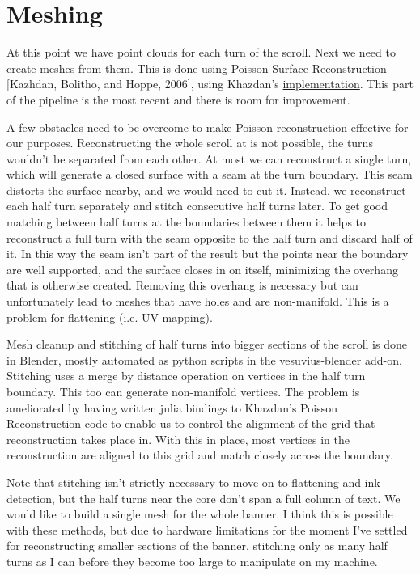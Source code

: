 \documentclass{article}
\begin{document}
\section{Meshing}

At this point we have point clouds for each turn of the scroll. Next we need to create meshes from them. This is done using Poisson Surface Reconstruction [Kazhdan, Bolitho, and Hoppe, 2006], using Khazdan's \href{https://github.com/mkazhdan/PoissonRecon}{implementation}. This part of the pipeline is the most recent and there is room for improvement.

A few obstacles need to be overcome to make Poisson reconstruction effective for our purposes. Reconstructing the whole scroll at is not possible, the turns wouldn't be separated from each other. At most we can reconstruct a single turn, which will generate a closed surface with a seam at the turn boundary. This seam distorts the surface nearby, and we would need to cut it. Instead, we reconstruct each half turn separately and stitch consecutive half turns later. To get good matching between half turns at the boundaries between them it helps to reconstruct a full turn with the seam opposite to the half turn and discard half of it. In this way the seam isn't part of the result but the points near the boundary are well supported, and the surface closes in on itself, minimizing the overhang that is otherwise created. Removing this overhang is necessary but can unfortunately lead to meshes that have holes and are non-manifold. This is a problem for flattening (i.e. UV mapping).

Mesh cleanup and stitching of half turns into bigger sections of the scroll is done in Blender, mostly automated as python scripts in the \href{https://github.com/spelufo/vesuvius-blender}{vesuvius-blender} add-on. Stitching uses a merge by distance operation on vertices in the half turn boundary. This too can generate non-manifold vertices. The problem is ameliorated by having written julia bindings to Khazdan's Poisson Reconstruction code to enable us to control the alignment of the grid that reconstruction takes place in. With this in place, most vertices in the reconstruction are aligned to this grid and match closely across the boundary.

Note that stitching isn't strictly necessary to move on to flattening and ink detection, but the half turns near the core don't span a full column of text. We would like to build a single mesh for the whole banner. I think this is possible with these methods, but due to hardware limitations for the moment I've settled for reconstructing smaller sections of the banner, stitching only as many half turns as I can before they become too large to manipulate on my machine.
\end{document}
